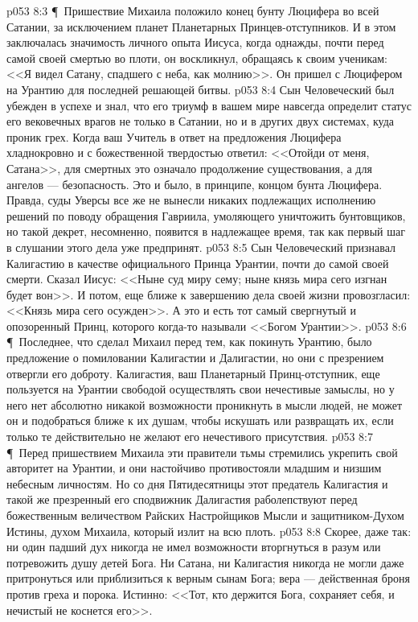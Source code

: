 \vs p053 8:3 \P\ Пришествие Михаила положило конец бунту Люцифера во всей Сатании, за исключением планет Планетарных Принцев\hyp{}отступников. И в этом заключалась значимость личного опыта Иисуса, когда однажды, почти перед самой своей смертью во плоти, он воскликнул, обращаясь к своим ученикам: <<Я видел Сатану, спадшего с неба, как молнию>>. Он пришел с Люцифером на Урантию для последней решающей битвы.
\vs p053 8:4 Сын Человеческий был убежден в успехе и знал, что его триумф в вашем мире навсегда определит статус его вековечных врагов не только в Сатании, но и в других двух системах, куда проник грех. Когда ваш Учитель в ответ на предложения Люцифера хладнокровно и с божественной твердостью ответил: <<Отойди от меня, Сатана>>, для смертных это означало продолжение существования, а для ангелов --- безопасность. Это и было, в принципе, концом бунта Люцифера. Правда, суды Уверсы все же не вынесли никаких подлежащих исполнению решений по поводу обращения Гавриила, умоляющего уничтожить бунтовщиков, но такой декрет, несомненно, появится в надлежащее время, так как первый шаг в слушании этого дела уже предпринят.
\vs p053 8:5 Сын Человеческий признавал Калигастию в качестве официального Принца Урантии, почти до самой своей смерти. Сказал Иисус: <<Ныне суд миру сему; ныне князь мира сего изгнан будет вон>>. И потом, еще ближе к завершению дела своей жизни провозгласил: <<Князь мира сего осужден>>. А это и есть тот самый свергнутый и опозоренный Принц, которого когда\hyp{}то называли <<Богом Урантии>>.
\vs p053 8:6 \P\ Последнее, что сделал Михаил перед тем, как покинуть Урантию, было предложение о помиловании Калигастии и Далигастии, но они с презрением отвергли его доброту. Калигастия, ваш Планетарный Принц\hyp{}отступник, еще пользуется на Урантии свободой осуществлять свои нечестивые замыслы, но у него нет абсолютно никакой возможности проникнуть в мысли людей, не может он и подобраться ближе к их душам, чтобы искушать или развращать их, если только те действительно не желают его нечестивого присутствия.
\vs p053 8:7 \P\ Перед пришествием Михаила эти правители тьмы стремились укрепить свой авторитет на Урантии, и они настойчиво противостояли младшим и низшим небесным личностям. Но со дня Пятидесятницы этот предатель Калигастия и такой же презренный его сподвижник Далигастия раболепствуют перед божественным величеством Райских Настройщиков Мысли и защитником\hyp{}Духом Истины, духом Михаила, который излит на всю плоть.
\vs p053 8:8 Скорее, даже так: ни один падший дух никогда не имел возможности вторгнуться в разум или потревожить душу детей Бога. Ни Сатана, ни Калигастия никогда не могли даже притронуться или приблизиться к верным сынам Бога; вера --- действенная броня против греха и порока. Истинно: <<Тот, кто держится Бога, сохраняет себя, и нечистый не коснется его>>.

